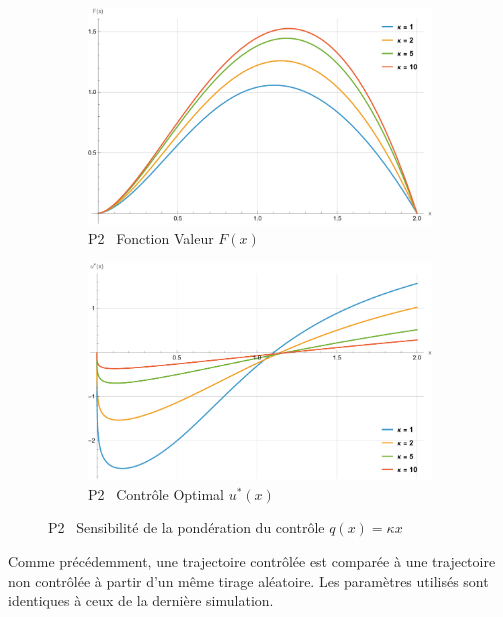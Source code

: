 \FloatBarrier\begin{figure}[htb]
    \centering
    \begin{subfigure}{0.49\linewidth}
        \includegraphics[width=\linewidth]{img/validation/P2/p2_K_value.pdf}
        \caption{P2 \textemdash~Fonction Valeur $F(x)$}\label{fig:KappaValueVisualisation2}
    \end{subfigure}
    \hfill
    \begin{subfigure}{0.49\linewidth}
        \includegraphics[width=\linewidth]{img/validation/P2/p2_K_control.pdf}
        \caption{P2 \textemdash~Contrôle Optimal $u^*(x)$}\label{fig:KappaControlVisualisation2}
    \end{subfigure}
    \caption{P2 \textemdash~Sensibilité de la pondération du contrôle $q(x)=\kappa x$}\label{fig:KappaValueControlComparison2}
\end{figure}
\FloatBarrier Comme précédemment, une trajectoire contrôlée est comparée à une trajectoire non contrôlée à partir d'un même tirage aléatoire. Les paramètres utilisés sont identiques à ceux de la dernière simulation.
